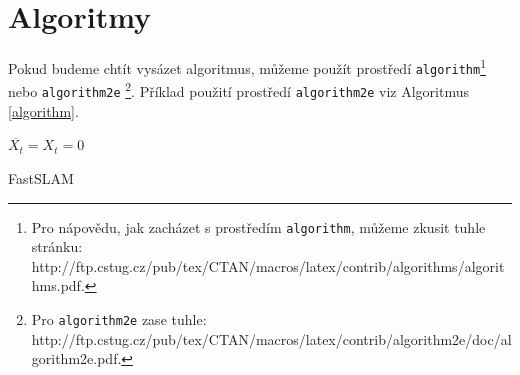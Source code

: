 \documentclass[a4paper,11pt]{article}
\begin{document}
\section{Algoritmy}
\label{algorithm_sec}
Pokud budeme chtít vysázet algoritmus, můžeme použít prostředí \texttt{algorithm}\footnote{Pro nápovědu, jak zacházet s prostředím \texttt{algorithm}, můžeme zkusit tuhle stránku:\\
http://ftp.cstug.cz/pub/tex/CTAN/macros/latex/contrib/algorithms/algorithms.pdf.} nebo \texttt{algorithm2e}
\footnote{Pro \texttt{algorithm2e} zase tuhle: \scriptsize{http://ftp.cstug.cz/pub/tex/CTAN/macros/latex/contrib/algorithm2e/doc/algorithm2e.pdf.}}.
Příklad použití prostředí \texttt{algorithm2e} viz Algoritmus \ref{algorithm}.

\begin{algorithm}
\SetNlSty{}{}{:}
\DontPrintSemicolon
{}
$\overline{X_t} = X_t = 0$\\
\caption{FastSLAM}
\label{algorithm}
\end{algorithm}
\end{document}

